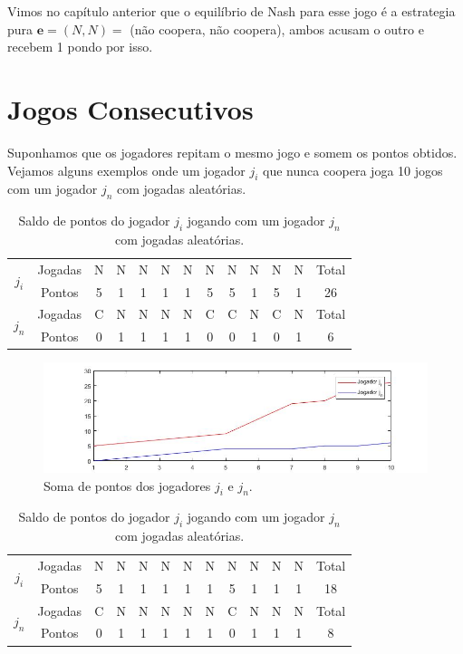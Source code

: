 Vimos no capítulo anterior que o equilíbrio de Nash para esse jogo é a estrategia pura $\textbf{e}=(N,N)=$ (não coopera, não coopera), ambos acusam o outro e recebem 1 pondo por isso. 

\section{Jogos Consecutivos}

Suponhamos que os jogadores repitam o mesmo jogo e somem os pontos obtidos. Vejamos alguns exemplos onde um jogador $j_i$ que nunca coopera joga 10 jogos com um jogador $j_n$ com jogadas aleatórias.

\begin{table}[H]
\centering
\begin{tabular}{|c|c|c|c|c|c|c|c|c|c|c|c|c|}\hline
\multirow{2}{*}{$j_i$} & Jogadas & N & N & N & N & N & N & N & N &	N &	N & Total\\\cline{2-12}
 & Pontos & 5 & 1 & 1 & 1 & 1 & 5 & 5 & 1 & 5 & 1 & 26\\\hline\hline
\multirow{2}{*}{$j_n$} & Jogadas & C & N & N & N & N & C & C & N &	C &	N & Total\\\cline{2-12}
 & Pontos & 0 & 1 & 1 & 1 & 1 & 0 & 0 & 1 & 0 & 1 & 6\\\hline
\end{tabular}
\caption{Saldo de pontos do jogador $j_i$ jogando com um jogador $j_n$ com jogadas aleatórias.}
\label{tab1}
\end{table}

\begin{figure}[H]
\centering
\includegraphics[width=14cm]{imagens/graf1.jpg}
\caption{Soma de pontos dos jogadores $j_i$ e $j_n$.}
\label{fig1}
\end{figure}

\begin{table}[H]
\centering
\begin{tabular}{|c|c|c|c|c|c|c|c|c|c|c|c|c|}\hline
\multirow{2}{*}{$j_i$} & Jogadas & N & N & N & N & N & N & N & N &	N &	N & Total\\\cline{2-12}
 & Pontos & 5 & 1 & 1 & 1 & 1 & 1 & 5 & 1 & 1 & 1 & 18\\\hline\hline
\multirow{2}{*}{$j_n$} & Jogadas & C & N & N & N & N & N & C & N &	N &	N & Total\\\cline{2-12}
 & Pontos & 0 & 1 & 1 & 1 & 1 & 1 & 0 & 1 & 1 & 1 & 8\\\hline
\end{tabular}
\caption{Saldo de pontos do jogador $j_i$ jogando com um jogador $j_n$ com jogadas aleatórias.}
\label{tab2}
\end{table}

